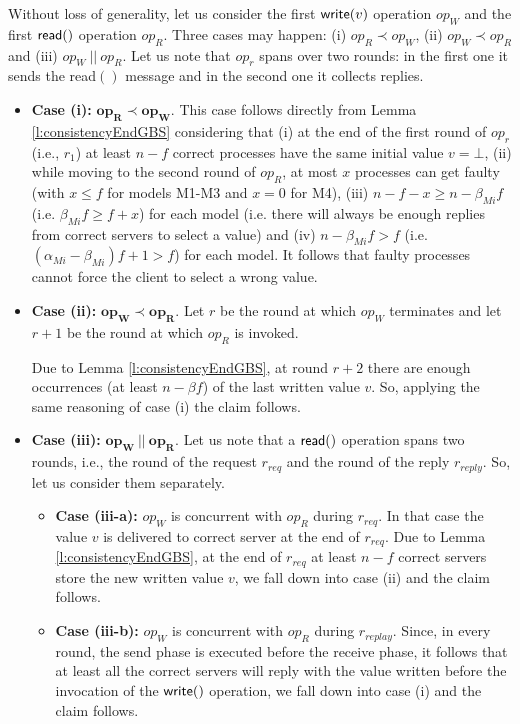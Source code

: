\begin{proofT}
Without loss of generality, let us consider the first ${\sf write}(v)$ operation $op_W$ and the first ${\sf read}()$ operation $op_R$. 
Three cases may happen: (i) $op_R \prec op_W$, (ii) $op_W \prec op_R$ and (iii) $op_W ~|| ~op_R$.
Let us note that $op_r$ spans over two rounds: in the first one it sends the {\sc read}$()$ message and in the second one it collects replies.

	\begin{itemize}
		\item {\bf Case (i):} $\mathbf{op_R \prec op_W}$. This case follows directly from Lemma \ref{l:consistencyEndGBS} considering that (i) at the end of the first round of $op_r$ (i.e., $r_1$) at least $n-f$ correct processes have the same initial value $v=\bot$, (ii) while moving to the second round of $op_R$, at most $x$ processes can get faulty (with $x\le f$ for models M1-M3 and $x=0$ for M4), (iii) $n-f-x \ge n- \beta_{Mi}f$ (i.e. $\beta_{Mi}f \ge f+x$) for each model (i.e. there will always be enough replies from correct servers to select a value) and (iv) $n- \beta_{Mi}f > f$ (i.e. $(\alpha_{Mi}-\beta_{Mi})f +1 > f$) for each model.
It follows that faulty processes cannot force the client to select a wrong value.\\
		
		\item  {\bf Case (ii):} $\mathbf{op_W \prec op_R}$. Let $r$ be the round at which $op_W$ terminates and let $r+1$ be the round at which $op_R$ is invoked.
		
Due to Lemma \ref{l:consistencyEndGBS}, at round $r+2$ there are enough occurrences (at least $n-\beta f$) of the last written value $v$. So, applying the same reasoning of case (i) the claim follows.\\	
		
		\item {\bf Case (iii):} $\mathbf{op_W ~|| ~op_R}$. Let us note that a ${\sf read}()$ operation spans two rounds, i.e., the round of the request $r_{req}$ and the round of the reply $r_{reply}$. So, let us consider them separately.
		
		\begin{itemize}
			\item {\bf Case (iii-a):} $op_W$ is concurrent with $op_R$ during $r_{req}$. In that case the value $v$ is delivered to correct server at the end of $r_{req}$. Due to Lemma \ref{l:consistencyEndGBS}, at the end of $r_{req}$ at least $n-f$ correct servers store the new written value $v$, we fall down into case (ii) and the claim follows.\\
\item {\bf Case (iii-b):} $op_W$ is concurrent with $op_R$ during $r_{replay}$. Since, in every round, the send phase is executed before the receive phase, it follows that at least all the correct servers will reply with the value written before the invocation of the ${\sf write}()$ operation, we fall down into case (i) and the claim follows.
\end{itemize}	
	\end{itemize}
	
\renewcommand{\toto}{t:validity}
\end{proofT}

